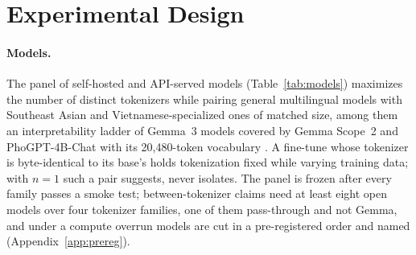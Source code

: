 \section{Experimental Design}
\label{sec:setup}

\paragraph{Models.}
The panel of  self-hosted and  API-served models (Table~\ref{tab:models}) maximizes the number of distinct tokenizers while pairing general multilingual models with Southeast Asian and Vietnamese-specialized ones of matched size, among them an interpretability ladder of Gemma~3 models covered by Gemma Scope~2 \citep{gemma-team-2025-gemma3,deepmind-2025-gemma-scope-2} and PhoGPT-4B-Chat with its 20,480-token vocabulary \citep{2311.02945}. A fine-tune whose tokenizer is byte-identical to its base's holds tokenization fixed while varying training data; with $n = 1$ such a pair suggests, never isolates. The panel is frozen after every family passes a smoke test; between-tokenizer claims need at least eight open models over four tokenizer families, one of them pass-through and not Gemma, and under a compute overrun models are cut in a pre-registered order and named (Appendix~\ref{app:prereg}).

